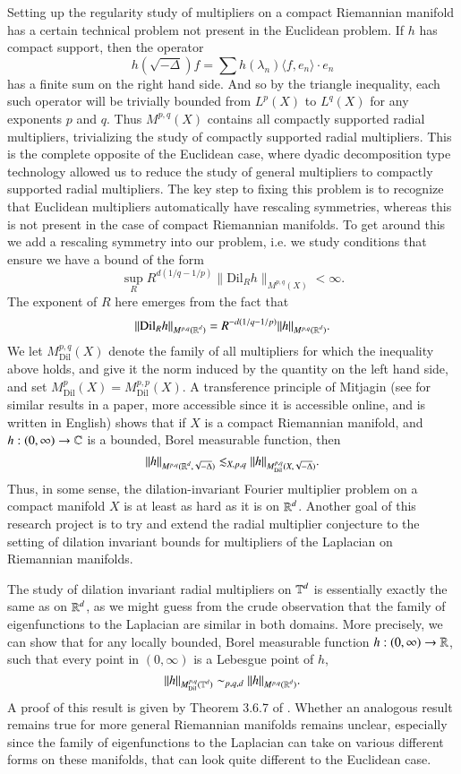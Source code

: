 Setting up the regularity study of multipliers on a compact Riemannian manifold has a certain technical problem not present in the Euclidean problem. If $h$ has compact support, then the operator
%
\[ h \left( \sqrt{-\Delta} \right) f = \sum h(\lambda_n) \langle f, e_n \rangle \cdot e_n \]
%
has a finite sum on the right hand side. And so by the triangle inequality, each such operator will be trivially bounded from $L^p(X)$ to $L^q(X)$ for any exponents $p$ and $q$. Thus $M^{p,q}(X)$ contains all compactly supported radial multipliers, trivializing the study of compactly supported radial multipliers. This is the complete opposite of the Euclidean case, where dyadic decomposition type technology allowed us to reduce the study of general multipliers to compactly supported radial multipliers. The key step to fixing this problem is to recognize that Euclidean multipliers automatically have rescaling symmetries, whereas this is not present in the case of compact Riemannian manifolds. To get around this we add a rescaling symmetry into our problem, i.e. we study conditions that ensure we have a bound of the form
%
\[ \sup_R R^{d(1/q - 1/p)} \| \text{Dil}_R h \|_{M^{p,q}(X)} < \infty. \]
%
The exponent of $R$ here emerges from the fact that
%
\[ \| \text{Dil}_R h \|_{M^{p,q}(\operatorname{\mathbb{R}}^d)} = R^{-d(1/q - 1/p)} \| h \|_{M^{p,q}(\operatorname{\mathbb{R}}^d)}. \]
%
We let $M^{p,q}_{\text{Dil}}(X)$ denote the family of all multipliers for which the inequality above holds, and give it the norm induced by the quantity on the left hand side, and set $M^p_{\text{Dil}}(X) = M^{p,p}_{\text{Dil}}(X)$. A transference principle of Mitjagin \cite{Mitjagin} (see \cite{KenigStantonTomas} for similar results in a paper, more accessible since it is accessible online, and is written in English) shows that if $X$ is a compact Riemannian manifold, and $h: (0,\infty) \to \operatorname{\mathbb{C}}$ is a bounded, Borel measurable function, then
%
\[ \| h \|_{M^{p,q}(\operatorname{\mathbb{R}}^d, \sqrt{-\Delta})} \lesssim_{X,p,q} \| h \|_{M^{p,q}_{\text{Dil}}(X, \sqrt{-\Delta})}. \]
%
Thus, in some sense, the dilation-invariant Fourier multiplier problem on a compact manifold $X$ is at least as hard as it is on $\operatorname{\mathbb{R}}^d$. Another goal of this research project is to try and extend the radial multiplier conjecture to the setting of dilation invariant bounds for multipliers of the Laplacian on Riemannian manifolds.

The study of dilation invariant radial multipliers on $\operatorname{\mathbb{T}}^d$ is essentially exactly the same as on $\operatorname{\mathbb{R}}^d$, as we might guess from the crude observation that the family of eigenfunctions to the Laplacian are similar in both domains. More precisely, we can show that for any locally bounded, Borel measurable function $h: (0,\infty) \to \operatorname{\mathbb{R}}$, such that every point in $(0,\infty)$ is a Lebesgue point of $h$,
%
\[ \| h \|_{M^{p,q}_{\text{Dil}}(\operatorname{\mathbb{T}}^d)} \sim_{p,q,d} \| h \|_{M^{p,q}(\operatorname{\mathbb{R}}^d)}. \]
%
A proof of this result is given by Theorem 3.6.7 of \cite{Grafakos}. Whether an analogous result remains true for more general Riemannian manifolds remains unclear, especially since the family of eigenfunctions to the Laplacian can take on various different forms on these manifolds, that can look quite different to the Euclidean case.

